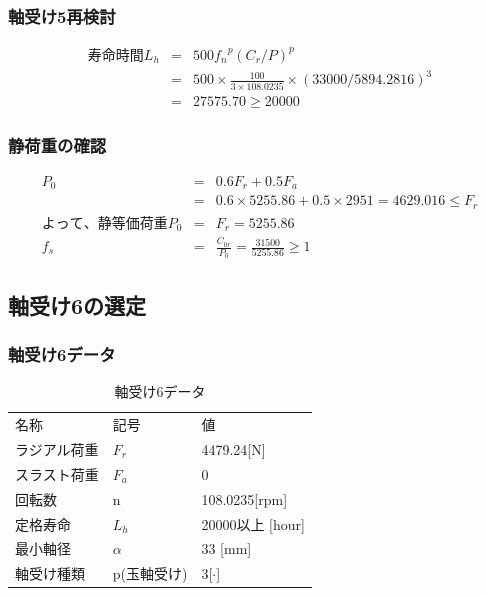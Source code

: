 \documentclass[a4j,twoside,openright,11pt]{jreport}
\begin{document}
\subsubsection{軸受け5再検討}
\begin{eqnarray}
寿命時間L_h &=& 500{f_n}^p(C_r/P)^p\\
           &=& 500 \times \frac{100}{3 \times 108.0235} \times (33000/5894.2816)^3\\
           &=& 27575.70 \geq 20000
\end{eqnarray}

\subsubsection{静荷重の確認}
\begin{eqnarray}
P_0&=&0.6F_r+0.5F_a\\
&=&0.6 \times 5255.86 + 0.5 \times 2951 = 4629.016 \leq F_r\\
よって、静等価荷重P_0 &=& F_r = 5255.86\\
f_s &=& \frac{C_{0r}}{P_0} = \frac{31500}{5255.86}\geq 1
\end{eqnarray}


\newpage
\subsection{軸受け6の選定}

\subsubsection{軸受け6データ}
\begin{table}[htb]
\begin{center}
  \caption{軸受け6データ}
  \begin{tabular}{lll} \hline
名称&記号&値\\
ラジアル荷重&$F_r$&4479.24[N]\\
スラスト荷重&$F_a$&0\\
回転数&n&108.0235[rpm]\\
定格寿命&$L_h$&20000以上 [hour]\\
最小軸径&$\alpha$&33 [mm]\\
軸受け種類&p(玉軸受け)&3[$\cdot$]\\
\hline
  \end{tabular}
\end{center}
\end{table}
\end{document}
